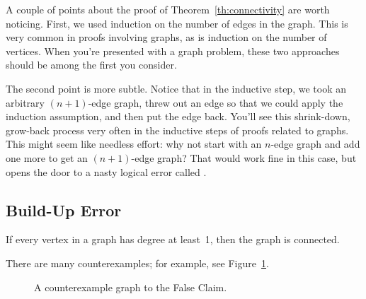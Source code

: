 A couple of points about the proof of Theorem~\ref{th:connectivity}
are worth noticing.  First, we used induction on the number of edges
in the graph.  This is very common in proofs involving graphs, as is
induction on the number of vertices.  When you're presented with a
graph problem, these two approaches should be among the first you
consider.

The second point is more subtle.  Notice that in the inductive step,
we took an arbitrary $(n+1)$-edge graph, threw out an edge so that
we could apply the induction assumption, and then put the edge back.
You'll see this shrink-down, grow-back process very often in the
inductive steps of proofs related to graphs.  This might seem like
needless effort: why not start with an $n$-edge graph and add one
more to get an $(n+1)$-edge graph?  That would work fine in this
case, but opens the door to a nasty logical error called
.

\subsection{Build-Up Error}

\begin{falseclm*}
If every vertex in a graph has degree at least~1, then the graph is
connected.
\end{falseclm*}

There are many counterexamples; for example, see Figure~\ref{fig:5Z}.

\begin{figure}


\caption{A counterexample graph to the False Claim.}

\label{fig:5Z}
\end{figure}

